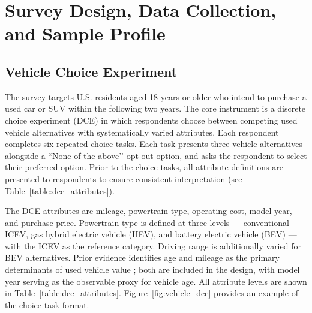\documentclass[a4paper,fleqn]{cas-sc}   %
\begin{document}
\section{Survey Design, Data Collection, and Sample Profile}

\subsection{Vehicle Choice Experiment}
\label{subsec:dce_design}

The survey targets U.S. residents aged 18 years or older who intend to purchase a used car or SUV within the following two years. The core instrument is a discrete choice experiment (DCE) in which respondents choose between competing used vehicle alternatives with systematically varied attributes. Each respondent completes six repeated choice tasks. Each task presents three vehicle alternatives alongside a ``None of the above’’ opt-out option, and asks the respondent to select their preferred option. Prior to the choice tasks, all attribute definitions are presented to respondents to ensure consistent interpretation (see Table~\ref{table:dce_attributes}).

The DCE attributes are mileage, powertrain type, operating cost, model year, and purchase price. Powertrain type is defined at three levels --- conventional ICEV, gas hybrid electric vehicle (HEV), and battery electric vehicle (BEV) --- with the ICEV as the reference category. Driving range is additionally varied for BEV alternatives. Prior evidence identifies age and mileage as the primary determinants of used vehicle value \parencite{prieto2015}; both are included in the design, with model year serving as the observable proxy for vehicle age. All attribute levels are shown in Table~\ref{table:dce_attributes}. Figure~\ref{fig:vehicle_dce} provides an example of the choice task format.
\end{document}
